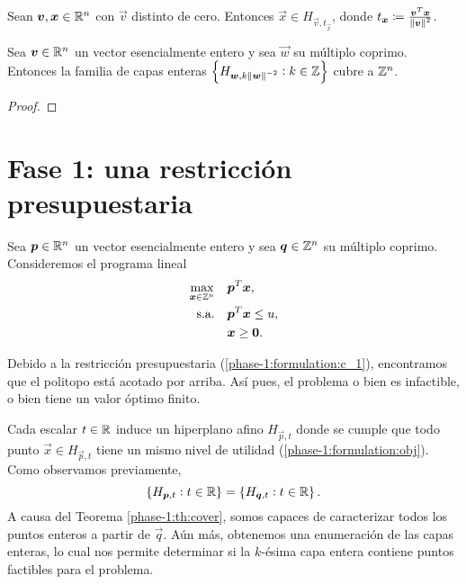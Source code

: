 \begin{lemma}
	\label{phase-1:lemma:layer}
	Sean $\boldsymbol{v}, \boldsymbol{x} \in \mathbb{R}^n$ con $\vec{v}$ distinto de cero. Entonces $\vec{x} \in
	H_{\vec{v}, t_{\vec{x}}}$, donde $t_{\boldsymbol{x}} \coloneq \frac{\boldsymbol{v}^T\boldsymbol{x}}{\left\lVert \boldsymbol{v} \right\rVert^2}$.
\end{lemma}

\begin{theorem}
	\label{phase-1:th:cover}
	Sea $\boldsymbol{v} \in \mathbb{R}^n$ un vector esencialmente entero y sea $\vec{w}$ su múltiplo coprimo.
	Entonces la familia de capas enteras $\left\lbrace H_{\boldsymbol{w}, k\left\lVert \boldsymbol{w} \right\rVert^{-2}} \vcentcolon k
			\in \mathbb{Z} \right\rbrace$ cubre a $\mathbb{Z}^n$.
\end{theorem}
\begin{proof}
\end{proof}

\section{Fase 1: una restricción presupuestaria}

\noindent
Sea $\boldsymbol{p} \in \mathbb{R}^n$ un vector esencialmente entero y sea $\boldsymbol{q} \in \mathbb{Z}^n$ su múltiplo coprimo.
Consideremos el programa lineal 
\begin{subequations}
	\label{phase-1:formulation}
	\begin{align}
		\max_{\boldsymbol{x} \in \mathbb{Z}^n} \quad
			& \boldsymbol{p}^T\boldsymbol{x}, \label{phase-1:formulation:obj} \\
		\text{s.a.} \quad
			& \boldsymbol{p}^T\boldsymbol{x} \leq u, \label{phase-1:formulation:c_1} \\
			& \boldsymbol{x} \geq \boldsymbol{0}. \nonumber
	\end{align}
\end{subequations}

\begin{observation}
	Debido a la restricción presupuestaria (\ref{phase-1:formulation:c_1}), encontramos que el
	politopo está acotado por arriba. Así pues, el problema o bien es infactible, o bien tiene un
	valor óptimo finito.
\end{observation}

Cada escalar $t \in \mathbb{R}$ induce un hiperplano afino $H_{\vec{p}, t}$ donde se cumple que todo punto
$\vec{x} \in H_{\vec{p}, t}$ tiene un mismo nivel de utilidad (\ref{phase-1:formulation:obj}). Como
observamos previamente,
\begin{equation*}
	\left \lbrace H_{\boldsymbol{p}, t} \vcentcolon t \in \mathbb{R} \right\rbrace
	=
	\left \lbrace H_{\boldsymbol{q}, t} \vcentcolon t \in \mathbb{R} \right\rbrace.
\end{equation*}
A causa del Teorema \ref{phase-1:th:cover}, somos capaces de caracterizar todos los puntos enteros a
partir de $\vec{q}$. Aún más, obtenemos una enumeración de las capas enteras, lo cual nos permite
determinar si la $k$-ésima capa entera contiene puntos factibles para el problema.

